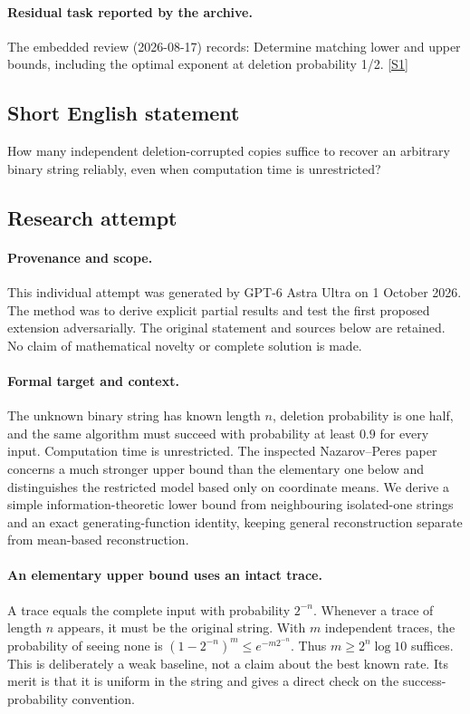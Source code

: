 \documentclass[11pt,a4paper]{article}
\newcommand{\sref}[2]{\hyperlink{source:#1:#2}{[S#2]}}
\begin{document}
\paragraph{Residual task reported by the archive.}

The embedded review (2026-08-17) records: Determine matching lower and upper bounds, including the optimal exponent at deletion probability 1/2. \sref{145}{1}

\subsection{Short English statement}

How many independent deletion-corrupted copies suffice to recover an arbitrary binary string reliably, even when computation time is unrestricted?

\subsection{Research attempt}

\paragraph{Provenance and scope.}
This individual attempt was generated by GPT-6 Astra Ultra on 1 October 2026. The method was to derive explicit partial results and test the first proposed extension adversarially. The original statement and sources below are retained. No claim of mathematical novelty or complete solution is made.

\paragraph{Formal target and context.}
The unknown binary string has known length $n$, deletion probability is one half, and the same algorithm must succeed with probability at least $0.9$ for every input. Computation time is unrestricted. The inspected Nazarov--Peres paper concerns a much stronger upper bound than the elementary one below and distinguishes the restricted model based only on coordinate means. We derive a simple information-theoretic lower bound from neighbouring isolated-one strings and an exact generating-function identity, keeping general reconstruction separate from mean-based reconstruction.

\paragraph{An elementary upper bound uses an intact trace.}
A trace equals the complete input with probability $2^{-n}$. Whenever a trace of length $n$ appears, it must be the original string. With $m$ independent traces, the probability of seeing none is $(1-2^{-n})^m\leq e^{-m2^{-n}}$. Thus $m\geq2^n\log10$ suffices. This is deliberately a weak baseline, not a claim about the best known rate. Its merit is that it is uniform in the string and gives a direct check on the success-probability convention.
\end{document}
